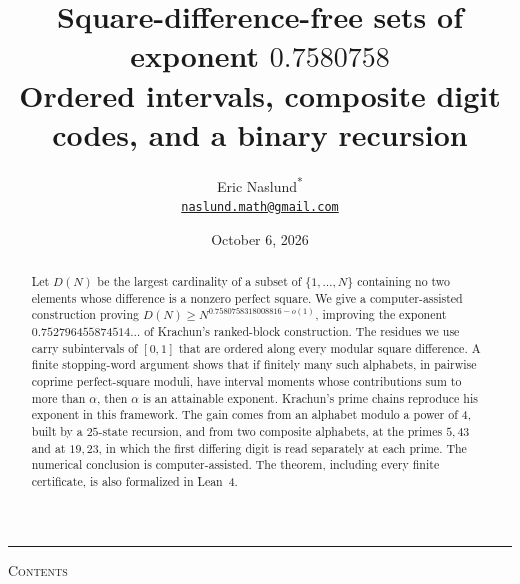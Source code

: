 \documentclass[11pt]{article}
\title{Square-difference-free sets of exponent \texorpdfstring{$0.7580758$}{0.7580758}\\[3pt]\large Ordered intervals, composite digit codes, and a binary recursion}
\author{Eric Naslund\textsuperscript{*}\\[3pt]
\normalsize\href{mailto:naslund.math@gmail.com}{\texttt{naslund.math@gmail.com}}}
\date{October 6, 2026}
\makeatletter
\renewcommand\tableofcontents{\begin{center}\normalsize\scshape Contents\end{center}\@starttoc{toc}}
\theoremstyle{definition}
\theoremstyle{remark}
\makeatother
\begin{document}
\maketitle
\begin{abstract}
Let $D(N)$ be the largest cardinality of a subset of $\{1,\ldots,N\}$
containing no two elements whose difference is a nonzero perfect square. We
give a computer-assisted construction proving
$D(N)\ge N^{0.7580758318008816-o(1)}$, improving the exponent
$0.752796455874514\ldots$ of Krachun's ranked-block construction. The residues
we use carry subintervals of $[0,1]$ that are ordered along every modular
square difference. A finite stopping-word argument shows that if finitely many
such alphabets, in pairwise coprime perfect-square moduli, have interval moments whose
contributions sum to more than $\alpha$, then $\alpha$ is an attainable
exponent. Krachun's prime chains reproduce his exponent in this framework. The
gain comes from an alphabet modulo a power of $4$, built by a $25$-state
recursion, and from two composite alphabets, at the primes $5,43$ and at
$19,23$, in which the first differing digit is read separately at each prime. The
numerical conclusion is computer-assisted. The theorem, including every finite
certificate, is also formalized in Lean~4.
\end{abstract}
\vspace{1.5\baselineskip}
\begin{center}
\end{center}
\vfill
\noindent\rule{0.25\linewidth}{0.4pt}\par\smallskip
{}
\clearpage
\setcounter{tocdepth}{1}
\begingroup
\small
\tableofcontents
\endgroup
\bigskip
\end{document}
